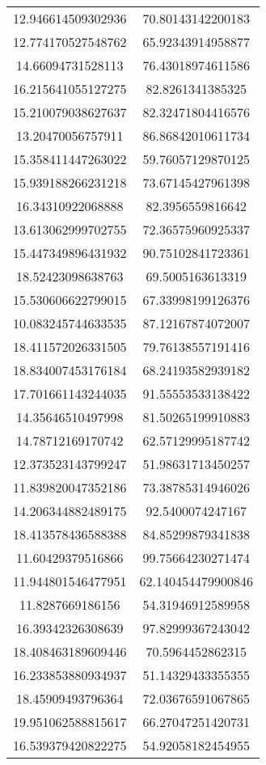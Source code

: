 \begin{table}
\begin{tabular}{cc}
12.946614509302936 & 70.80143142200183 \\
12.774170527548762 & 65.92343914958877 \\
14.66094731528113 & 76.43018974611586 \\
16.215641055127275 & 82.8261341385325 \\
15.210079038627637 & 82.32471804416576 \\
13.20470056757911 & 86.86842010611734 \\
15.358411447263022 & 59.76057129870125 \\
15.939188266231218 & 73.67145427961398 \\
16.34310922068888 & 82.3956559816642 \\
13.613062999702755 & 72.36575960925337 \\
15.447349896431932 & 90.75102841723361 \\
18.52423098638763 & 69.5005163613319 \\
15.530606622799015 & 67.33998199126376 \\
10.083245744633535 & 87.12167874072007 \\
18.411572026331505 & 79.76138557191416 \\
18.834007453176184 & 68.24193582939182 \\
17.701661143244035 & 91.55553533138422 \\
14.35646510497998 & 81.50265199910883 \\
14.78712169170742 & 62.57129995187742 \\
12.373523143799247 & 51.98631713450257 \\
11.839820047352186 & 73.38785314946026 \\
14.206344882489175 & 92.5400074247167 \\
18.413578436588388 & 84.85299879341838 \\
11.60429379516866 & 99.75664230271474 \\
11.944801546477951 & 62.140454479900846 \\
11.8287669186156 & 54.31946912589958 \\
16.39342326308639 & 97.82999367243042 \\
18.408463189609446 & 70.5964452862315 \\
16.233853880934937 & 51.14329433355355 \\
18.45909493796364 & 72.03676591067865 \\
19.951062588815617 & 66.27047251420731 \\
16.539379420822275 & 54.92058182454955 \\

\end{tabular}
\end{table}
